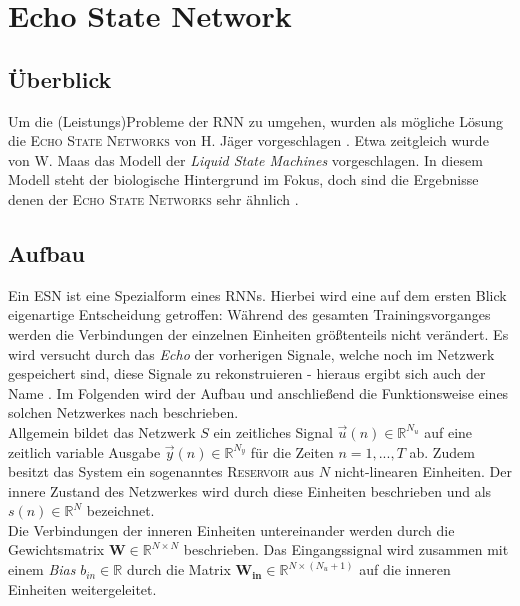 \section{Echo State Network}
\label{sc:esn}
\subsection{Überblick}
Um die (Leistungs)Probleme der \textsc{RNN} zu umgehen, wurden als mögliche Lösung die \textsc{Echo State Networks} von H. Jäger vorgeschlagen \cite{jaeger2010}. Etwa zeitgleich wurde von W. Maas das Modell der \textit{Liquid State Machines} vorgeschlagen. In diesem Modell steht der biologische Hintergrund im Fokus, doch sind die Ergebnisse denen der \textsc{Echo State Networks} sehr ähnlich \citep{Maass2011}. 

\subsection{Aufbau}
\label{sec:esn_structure}
Ein \textsc{ESN} ist eine Spezialform eines \textsc{RNN}s. Hierbei wird eine auf dem ersten Blick eigenartige Entscheidung getroffen: Während des gesamten Trainingsvorganges werden die Verbindungen der einzelnen Einheiten größtenteils nicht verändert. Es wird versucht durch das \textit{Echo} der vorherigen Signale, welche noch im Netzwerk gespeichert sind, diese Signale zu rekonstruieren - hieraus ergibt sich auch der Name \cite{lukoseviciusa2009}. Im Folgenden wird der Aufbau und anschließend die Funktionsweise eines solchen Netzwerkes nach \citep{jaeger2007} beschrieben.\\

Allgemein bildet das Netzwerk $S$ ein zeitliches Signal $\vec{u}(n) \in \mathbb{R}^{N_u}$  auf eine zeitlich variable Ausgabe $\vec{y}(n) \in \mathbb{R}^{N_y}$ für die Zeiten $n=1, ..., T$ ab. Zudem besitzt das System ein sogenanntes \textsc{Reservoir} aus $N$ nicht-linearen Einheiten. Der innere Zustand des Netzwerkes wird durch diese Einheiten beschrieben und als $s(n) \in \mathbb{R}^{N}$ bezeichnet.\\
Die Verbindungen der inneren Einheiten untereinander werden durch die Gewichtsmatrix $\mathbf{W} \in \mathbb{R}^{N \times N}$ beschrieben. Das Eingangssignal wird zusammen mit einem \textit{Bias} $b_{in} \in \mathbb{R}$ durch die Matrix $\mathbf{W_{in}} \in \mathbb{R}^{N \times (N_u+1)}$ auf die inneren Einheiten weitergeleitet.\\

